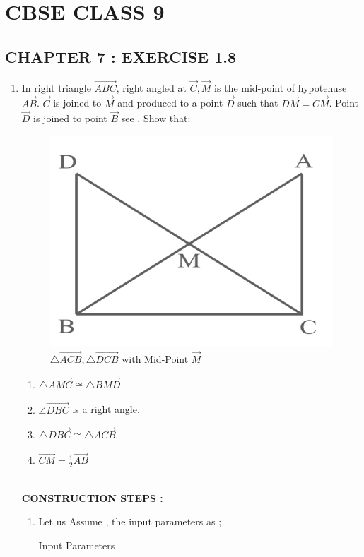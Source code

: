 \documentclass[10pt]{article}
\begin{document}
\section*{CBSE CLASS 9}
\subsection*{CHAPTER 7 : EXERCISE 1.8}
\begin{enumerate}
\item In right triangle $\vec{ABC}$, right angled at $\vec{C}, \vec{M}$ is the mid-point of hypotenuse $\vec{AB}$. $\vec{C}$ is joined to $\vec{M}$ and produced to a point $\vec{D}$ such that $\vec{DM}=\vec{CM}$. Point $\vec{D}$ is joined to point $\vec{B}$ see . Show that:
\begin{figure}[H]
\centering
  \includegraphics[width=\columnwidth]{figs/Screenshot.png}
  \caption{$\triangle \vec{ACB} ,\triangle \vec{DCB}$ with Mid-Point $\vec{M}$}
  \label{fig:triangles}
\end{figure}
\begin{enumerate}[label =(\roman*)]
	\item $\triangle \vec{AMC} \cong \triangle \vec{BMD}$
	\item $\angle \vec{DBC}$ is a right angle. 
	\item $\triangle \vec{DBC} \cong  \triangle \vec{ACB}$ 
	\item $\vec{CM} = \frac{1}{2} \vec{AB}$
\end{enumerate}
\pagebreak
\solution\\
\textbf{CONSTRUCTION STEPS :}
\begin{enumerate}
\item Let us Assume , the input parameters as ;
\begin{table}[H]
\centering
	
	  \caption{Input Parameters}
	  \label{Table-1:Input_params}
\end{table}


\end{enumerate}
\end{enumerate}
\end{document}
